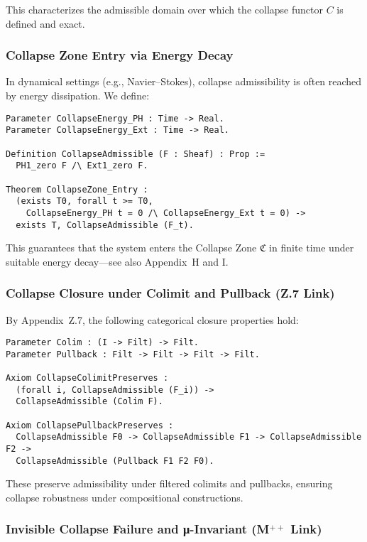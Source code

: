 \documentclass[11pt]{article}
\begin{document}
This characterizes the admissible domain over which the collapse functor \( C \) is defined and exact.

\subsubsection*{Collapse Zone Entry via Energy Decay}

In dynamical settings (e.g., Navier–Stokes), collapse admissibility is often reached by energy dissipation. We define:

\begin{lstlisting}[language=Coq]
Parameter CollapseEnergy_PH : Time -> Real.
Parameter CollapseEnergy_Ext : Time -> Real.

Definition CollapseAdmissible (F : Sheaf) : Prop :=
  PH1_zero F /\ Ext1_zero F.

Theorem CollapseZone_Entry :
  (exists T0, forall t >= T0,
    CollapseEnergy_PH t = 0 /\ CollapseEnergy_Ext t = 0) ->
  exists T, CollapseAdmissible (F_t).
\end{lstlisting}

This guarantees that the system enters the Collapse Zone \( \mathfrak{C} \) in finite time under suitable energy decay—see also Appendix~H and I.

\subsubsection*{Collapse Closure under Colimit and Pullback (Z.7 Link)}

By Appendix~Z.7, the following categorical closure properties hold:

\begin{lstlisting}[language=Coq]
Parameter Colim : (I -> Filt) -> Filt.
Parameter Pullback : Filt -> Filt -> Filt -> Filt.

Axiom CollapseColimitPreserves :
  (forall i, CollapseAdmissible (F_i)) ->
  CollapseAdmissible (Colim F).

Axiom CollapsePullbackPreserves :
  CollapseAdmissible F0 -> CollapseAdmissible F1 -> CollapseAdmissible F2 ->
  CollapseAdmissible (Pullback F1 F2 F0).
\end{lstlisting}

These preserve admissibility under filtered colimits and pullbacks, ensuring collapse robustness under compositional constructions.

\subsubsection*{Invisible Collapse Failure and μ-Invariant (M$^{++}$ Link)}
\end{document}
